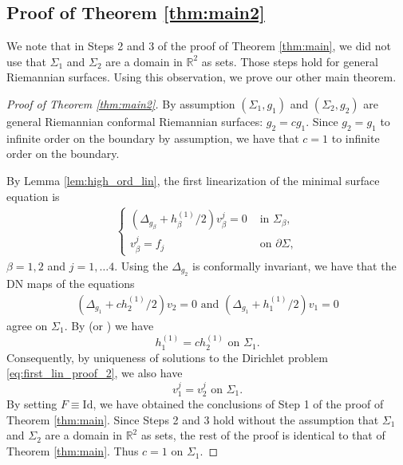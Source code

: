 \documentclass[12pt]{amsart}
\def\p{\partial}
\def\R{\mathbb R}
\theoremstyle{definition}
\theoremstyle{remark}
\begin{document}
\subsection{Proof of Theorem \ref{thm:main2}}
We note that in Steps 2 and 3 of the proof of Theorem \ref{thm:main}, we did not use that $\Sigma_1$ and $\Sigma_2$ are a domain in $\R^2$ as sets. Those steps hold for general Riemannian surfaces.  Using this observation, we prove our other main theorem.
\begin{proof}[Proof of Theorem \ref{thm:main2}]
 By assumption $(\Sigma_1,g_1)$ and $(\Sigma_2,g_2)$ are general Riemannian conformal Riemannian surfaces: $g_2=cg_1$. Since $g_2=g_1$ to infinite order on the boundary by assumption, we have that $c=1$ to infinite order on the boundary. 
 
 By Lemma \ref{lem:high_ord_lin}, the first linearization of the minimal surface equation is  
\begin{equation}\label{eq:first_lin_proof_2}
	\begin{aligned}
		\begin{cases}
			(\Delta_{g_\beta}+h_{\beta}^{(1)}/2)v_\beta^{j}=0 
			& \text{ in } \Sigma_\beta,
			\\
			v_\beta^{j}=f_j
			&\text{ on }\p \Sigma,
		\end{cases}
	\end{aligned}
\end{equation}
$\beta=1,2$ and $j=1,\ldots 4$.
Using the $\Delta_{g_2}$ is conformally invariant, we have that the DN maps of the equations
\begin{align*}
 (\Delta_{g_1}+ch_{2}^{(1)}/2)v_2=0 \text{ and }  (\Delta_{g_1}+h_{1}^{(1)}/2)v_1=0
\end{align*}
agree on $\Sigma_1$. By \cite{guillarmou2011calderon} (or \cite{guillarmou2011identification}) we have 
\[
h_{1}^{(1)}=ch_{2}^{(1)} \text{ on } \Sigma_1.
\]
Consequently, by uniqueness of solutions to the Dirichlet problem \eqref{eq:first_lin_proof_2}, we also have
\[
 v_1^{j}=v_2^{j} \text{ on } \Sigma_1.
\]
By setting $F\equiv \text{Id}$, we have obtained the conclusions of Step 1 of the proof of Theorem \ref{thm:main}. Since Steps 2 and 3 hold without the assumption that $\Sigma_1$ and $\Sigma_2$ are a domain in $\R^2$ as sets, the rest of the proof is identical to that of Theorem \ref{thm:main}.  Thus $c=1$ on $\Sigma_1$. 
 

\end{proof}
\end{document}

